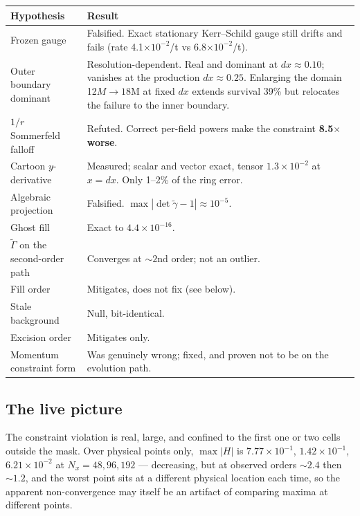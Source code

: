 \documentclass[11pt,openany]{book}
\newcommand{\Gt}{\tilde{\Gamma}}
\newcommand{\etr}{\tilde{\gamma}}
\begin{document}
\begin{longtable}{@{}>{\raggedright\arraybackslash}p{4.50cm}>{\raggedright\arraybackslash}p{9.00cm}@{}}
\toprule
\textbf{Hypothesis} & \textbf{Result} \\
\midrule
\endhead
Frozen gauge & Falsified. Exact stationary Kerr--Schild gauge still drifts and fails (rate 4.1$\times10^{-2}$/t vs 6.8$\times10^{-2}$/t). \\
Outer boundary dominant & Resolution-dependent. Real and dominant at $dx\approx0.10$; vanishes at the production $dx\approx0.25$. Enlarging the domain 12$M \to 18$M at fixed $dx$ extends survival 39\% but relocates the failure to the inner boundary. \\
$1/r$ Sommerfeld falloff & Refuted. Correct per-field powers make the constraint \textbf{8.5$\times$ worse}. \\
Cartoon $y$-derivative & Measured; scalar and vector exact, tensor $1.3\times10^{-2}$ at $x = dx$. Only 1--2\% of the ring error. \\
Algebraic projection & Falsified. $\max|\det\etr - 1| \approx 10^{-5}$. \\
Ghost fill & Exact to $4.4\times10^{-16}$. \\
$\Gt$ on the second-order path & Converges at $\sim 2$nd order; not an outlier. \\
Fill order & Mitigates, does not fix (see below). \\
Stale background & Null, bit-identical. \\
Excision order & Mitigates only. \\
Momentum constraint form & Was genuinely wrong; fixed, and proven not to be on the evolution path. \\
\bottomrule
\end{longtable}

\subsection{The live picture}

The constraint violation is real, large, and confined to the first one or two
cells outside the mask. Over physical points only, $\max|H|$ is
$7.77\times10^{-1}$, $1.42\times10^{-1}$, $6.21\times10^{-2}$ at
$N_x = 48, 96, 192$ --- decreasing, but at observed orders $\sim 2.4$ then
$\sim 1.2$, and the worst point sits at a different physical location each
time, so the apparent non-convergence may itself be an artifact of comparing
maxima at different points.
\end{document}
